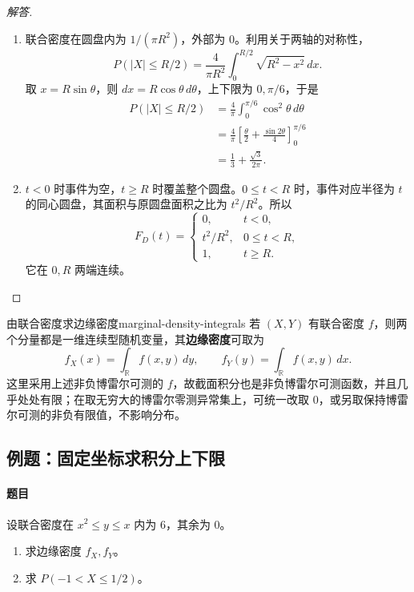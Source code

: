 \begin{proof}[解答]
\begin{enumerate}
\item 联合密度在圆盘内为 $1/(\pi R^2)$，外部为 $0$。利用关于两轴的对称性，
\[
P(|X|\leq R/2)=\frac4{\pi R^2}\int_0^{R/2}\sqrt{R^2-x^2}\,dx.
\]
取 $x=R\sin\theta$，则 $dx=R\cos\theta\,d\theta$，上下限为 $0,\pi/6$，于是
\begin{align*}
P(|X|\leq R/2)
&=\frac4\pi\int_0^{\pi/6}\cos^2\theta\,d\theta\\
&=\frac4\pi\left[\frac\theta2+\frac{\sin2\theta}4\right]_0^{\pi/6}\\
&=\frac13+\frac{\sqrt3}{2\pi}.
\end{align*}

\item $t<0$ 时事件为空，$t\geq R$ 时覆盖整个圆盘。$0\leq t<R$ 时，事件对应半径为 $t$ 的同心圆盘，其面积与原圆盘面积之比为 $t^2/R^2$。所以
\[
F_D(t)=
\begin{cases}
0,&t<0,\\
t^2/R^2,&0\leq t<R,\\
1,&t\geq R.
\end{cases}
\]
它在 $0,R$ 两端连续。
\end{enumerate}
\end{proof}

\begin{mytheorem}{由联合密度求边缘密度}{marginal-density-integrals}
若 $(X,Y)$ 有联合密度 $f$，则两个分量都是一维连续型随机变量，其\textbf{边缘密度}可取为
\[
f_X(x)=\int_{\mathbb R}f(x,y)\,dy,\qquad
f_Y(y)=\int_{\mathbb R}f(x,y)\,dx.
\]
这里采用上述非负博雷尔可测的 $f$，故截面积分也是非负博雷尔可测函数，并且几乎处处有限；在取无穷大的博雷尔零测异常集上，可统一改取 $0$，或另取保持博雷尔可测的非负有限值，不影响分布。
\end{mytheorem}

\subsection{例题：固定坐标求积分上下限}\label{note:c3:e5}
\paragraph{题目}
设联合密度在 $x^2\leq y\leq x$ 内为 $6$，其余为 $0$。
\begin{enumerate}
\item 求边缘密度 $f_X,f_Y$。

\item 求 $P(-1<X\leq1/2)$。
\end{enumerate}


